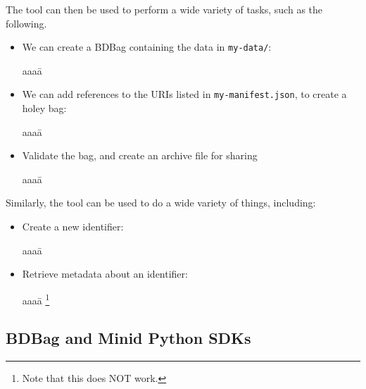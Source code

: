 \documentclass[11pt]{article}
\begin{document}
\noindent
The  tool can then be used to perform a wide variety of tasks, such as the following.
\begin{itemize}
\item
We can create a BDBag containing the data in \texttt{my-data/}:
\vspace{-2ex}
\begin{tabbing}
aaaa\=\kill
\>
\end{tabbing}

\item
We can add references to the URIs listed in \texttt{my-manifest.json}, to create a holey bag:
\vspace{-2ex}
\begin{tabbing}
aaaa\=\kill
\>
\end{tabbing}

\item
Validate the bag, and create an archive file for sharing
\vspace{-2ex}
\begin{tabbing}
aaaa\=\kill
\>
\end{tabbing}

\end{itemize}

\noindent
Similarly, the  tool can be used to do a wide variety of things, including:

\begin{itemize}
\item
Create a new identifier:
\vspace{-2ex}
\begin{tabbing}
aaaa\=\kill
\>
\end{tabbing}

\item
Retrieve metadata about an identifier:
\vspace{-2ex}
\begin{tabbing}
aaaa\=\kill
\>\footnote{Note that this does NOT work.}
\end{tabbing}
\end{itemize}
 

\subsection{BDBag and Minid Python SDKs} 
\end{document}
